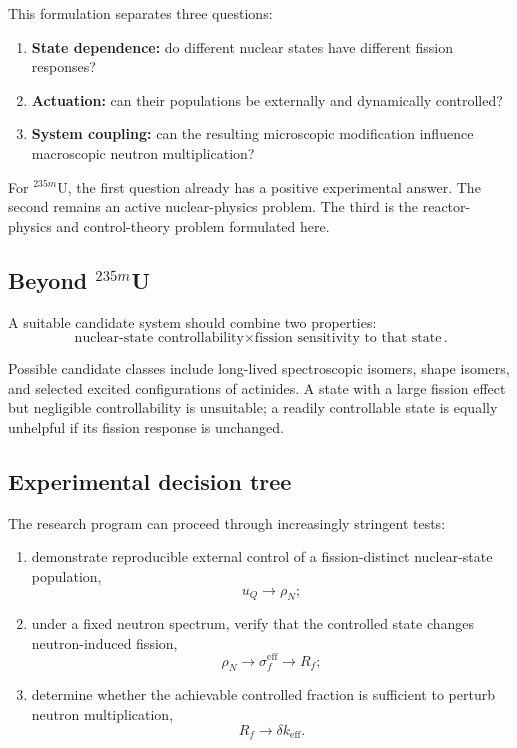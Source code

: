 This formulation separates three questions:
\begin{enumerate}
\item \textbf{State dependence:} do different nuclear states have different fission responses?
\item \textbf{Actuation:} can their populations be externally and dynamically controlled?
\item \textbf{System coupling:} can the resulting microscopic modification influence macroscopic neutron multiplication?
\end{enumerate}

For $^{235m}$U, the first question already has a positive experimental answer. The second remains an active nuclear-physics problem. The third is the reactor-physics and control-theory problem formulated here.

\subsection{Beyond \texorpdfstring{$^{235m}$U}{235mU}}

A suitable candidate system should combine two properties:
\begin{equation}
\boxed{
\text{nuclear-state controllability}
\times
\text{fission sensitivity to that state}
}.
\end{equation}

Possible candidate classes include long-lived spectroscopic isomers, shape isomers, and selected excited configurations of actinides. A state with a large fission effect but negligible controllability is unsuitable; a readily controllable state is equally unhelpful if its fission response is unchanged.

\subsection{Experimental decision tree}

The research program can proceed through increasingly stringent tests:
\begin{enumerate}
\item demonstrate reproducible external control of a fission-distinct nuclear-state population,
\begin{equation}
u_Q\rightarrow\rho_N;
\end{equation}
\item under a fixed neutron spectrum, verify that the controlled state changes neutron-induced fission,
\begin{equation}
\rho_N
\rightarrow
\sigma_f^{\mathrm{eff}}
\rightarrow
R_f;
\end{equation}
\item determine whether the achievable controlled fraction is sufficient to perturb neutron multiplication,
\begin{equation}
R_f
\rightarrow
\delta k_{\mathrm{eff}}.
\end{equation}
\end{enumerate}

